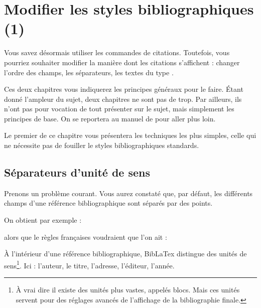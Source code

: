 \chapter{Modifier les styles bibliographiques (1)}

	\begin{prealable}
	
	Vous savez désormais utiliser les commandes de citations. Toutefois, vous pourriez souhaiter modifier la manière dont les citations s'affichent :  changer l'ordre des champs, les séparateurs, les textes du type .
	
	Ces deux chapitres vous indiquerez les principes généraux pour le faire. Étant donné l'ampleur du sujet, deux chapitres ne sont pas de trop. Par ailleurs, ils n'ont pas pour vocation de tout présenter sur le sujet, mais simplement les principes de base. On se reportera au manuel de  pour aller plus loin.
	
	Le premier de ce chapitre vous présentera les techniques les plus simples, celle qui ne nécessite pas de fouiller le styles bibliographiques standards. 
	
	
	\end{prealable}
	
	
\section{Séparateurs d'unité de sens}
	
Prenons un problème courant. Vous aurez constaté que, par défaut, les différents champs d'une référence bibliographique sont séparés par des points.

	On obtient par exemple :
	
	\renewcommand{\newunitpunct}[0]{\adddot\addspace} 
	
	\begin{quotation}
	\cite{Urner1952}
	\end{quotation}
	
alors que le règles françaises voudraient que l'on ait :
	
\renewcommand{\newunitpunct}[0]{\addcomma\addspace}
	
	\begin{quotation}
	\cite{Urner1952}
	\end{quotation}
	
À l'intérieur d'une référence bibliographique, BibLaTex distingue des unités de sens\footnote{À vrai dire il existe des unités plus vastes, appelés blocs. Mais ces unités servent pour des réglages avancés de l'affichage de la bibliographie finale.}. Ici : l'auteur, le titre, l'adresse, l'éditeur, l'année. 


